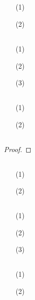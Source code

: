 \documentclass[UTF8]{ctexart}
\begin{document}
\subsection{}   %
\begin{enumerate}
    \item [(1)]
    \item [(2)]
\end{enumerate}

\subsection{}   %
\begin{enumerate}
    \item [(1)]
    \item [(2)]
    \item [(3)]
\end{enumerate}

\subsection{}   %
\begin{enumerate}
    \item [(1)]
    \item [(2)]
\end{enumerate}

\subsection{}   %
\begin{proof}
    
\end{proof}

\subsection{}   %
\begin{enumerate}
    \item [(1)]
    \item [(2)]
\end{enumerate}

\subsection{}   %
\begin{enumerate}
    \item [(1)]
    \item [(2)]
    \item [(3)]
\end{enumerate}

\subsection{}   %
\begin{enumerate}
    \item [(1)]
    \item [(2)]
\end{enumerate}
\end{document}
